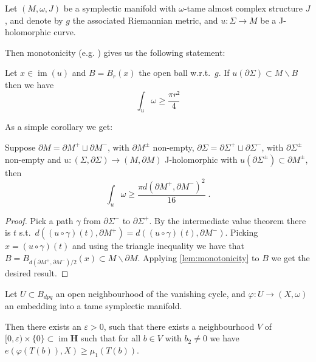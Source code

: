 \documentclass[12pt,a4paper,draft]{scrartcl}
\DeclareMathOperator{\im}{im}
\begin{document}
Let $(M,ω,J)$ be a symplectic manifold with $ω$-tame almost complex structure $J$, and denote by $g$ the associated Riemannian metric, and $u\colon Σ → M$ be a J-holomorphic curve.

Then monotonicity (e.g. \cite[Proposition 4.3.1 (ii)]{sikorav1994}) gives us the following statement:

\begin{lemma}[Monotonicity]
  \label{lem:monotonicity}
  Let $x ∈ \im(u)$ and $B = B_r(x)$ the open ball w.r.t.\ $g$. If $u(∂Σ) ⊂ M ∖ B$ then we have
  \[∫_u ω ≥ \frac{π r²}{4}\]
\end{lemma}

As a simple corollary we get:

\begin{corollary}
  \label{cor:small_buffer}
  Suppose $∂M = ∂M^+ ⊔ ∂M^-$, with $∂M^±$ non-empty, $∂Σ = ∂Σ^+ ⊔ ∂Σ^-$, with $∂Σ^±$ non-empty and $u\colon (Σ,∂Σ) → (M,∂M)$ J-holomorphic with $u(∂Σ^±) ⊂ ∂M^±$, then
  \[∫_u ω ≥ \frac{π d(∂M^+,∂M^-)^2}{16} \; .\]
\end{corollary}

\begin{proof}
  Pick a path $γ$ from $∂Σ^-$ to $∂Σ^+$. By the intermediate value theorem there is $t$ s.t.\ $d((u ∘ γ) (t),∂M^+) = d((u ∘ γ)(t), ∂M^-)$. Picking $x = (u ∘ γ)(t)$ and using the triangle inequality we have that $B = B_{d(∂M^+,∂M^-)/2}(x) ⊂ M ∖ ∂M $. Applying \cref{lem:monotonicity} to $B$ we get the desired result.
\end{proof}

\begin{proposition}
  Let $U ⊂ B_{dpq}$ an open neighbourhood of the vanishing cycle, and $φ:U → (X,ω)$ an embedding into a tame symplectic manifold.

  Then there exists an $ε>0$, such that there exists a neighbourhood $V$ of $[0,ε) × \{0\} ⊂ \im{\symbf{H}}$ such that for all $b ∈ V$ with $b_2 ≠ 0$ we have $e(φ(T(b)),X) ≥ μ_1(T(b))$.
\end{proposition}
\end{document}
